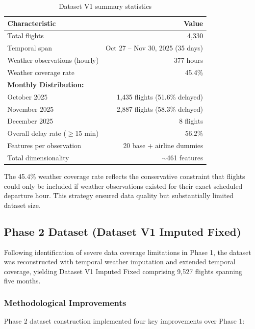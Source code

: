 \documentclass{report}
\begin{document}
\begin{table}[h]
\centering
\caption{Dataset V1 summary statistics}
\label{tab:phase1_summary}
\begin{tabular}{lr}
\toprule
\textbf{Characteristic} & \textbf{Value} \\
\midrule
Total flights & 4,330 \\
Temporal span & Oct 27 -- Nov 30, 2025 (35 days) \\
Weather observations (hourly) & 377 hours \\
Weather coverage rate & 45.4\% \\
\midrule
\textbf{Monthly Distribution:} & \\
October 2025 & 1,435 flights (51.6\% delayed) \\
November 2025 & 2,887 flights (58.3\% delayed) \\
December 2025 & 8 flights \\
\midrule
Overall delay rate ($\geq$15 min) & 56.2\% \\
Features per observation & 20 base + airline dummies \\
Total dimensionality & $\sim$461 features \\
\bottomrule
\end{tabular}
\end{table}

The 45.4\% weather coverage rate reflects the conservative constraint that flights could only be included if weather observations existed for their exact scheduled departure hour. This strategy ensured data quality but substantially limited dataset size.

\subsection{Phase 2 Dataset (Dataset V1 Imputed Fixed)}
\label{sec:phase2_dataset}

Following identification of severe data coverage limitations in Phase 1, the dataset was reconstructed with temporal weather imputation and extended temporal coverage, yielding Dataset V1 Imputed Fixed comprising 9,527 flights spanning five months.

\subsubsection{Methodological Improvements}

Phase 2 dataset construction implemented four key improvements over Phase 1:
\end{document}
